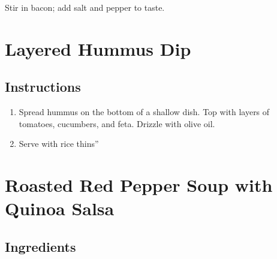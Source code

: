 \documentclass[ansiapaper,10pt,english]{sphinxmanual}
\begin{document}
Stir in bacon; add salt and pepper to taste.


\chapter{Layered Hummus Dip}
\label{\detokenize{layered_hd:layered-hummus-dip}}\label{\detokenize{layered_hd::doc}}
%
\begin{sphinxVerbatim}[commandchars=\\\{\}]
  

       

   

   

   
\end{sphinxVerbatim}


\section{Instructions}
\label{\detokenize{layered_hd:instructions}}\begin{enumerate}
\item {} 
Spread hummus on the bottom of a shallow dish. Top with layers of tomatoes, cucumbers, and feta. Drizzle with olive oil.

\item {} 
Serve with rice thins”

\end{enumerate}


\chapter{Roasted Red Pepper Soup with Quinoa Salsa}
\label{\detokenize{RRPS_Quinoa_Salsa:roasted-red-pepper-soup-with-quinoa-salsa}}\label{\detokenize{RRPS_Quinoa_Salsa::doc}}

\section{Ingredients}
\label{\detokenize{RRPS_Quinoa_Salsa:ingredients}}
%
\begin{sphinxVerbatim}[commandchars=\\\{\}]
       
\end{sphinxVerbatim}
\end{document}
